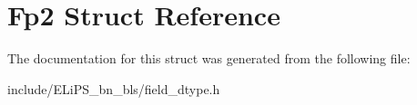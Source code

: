\hypertarget{struct_fp2}{}\section{Fp2 Struct Reference}
\label{struct_fp2}


The documentation for this struct was generated from the following file\+:\begin{DoxyCompactItemize}
\item 
include/\+E\+Li\+P\+S\+\_\+bn\+\_\+bls/field\+\_\+dtype.\+h\end{DoxyCompactItemize}
